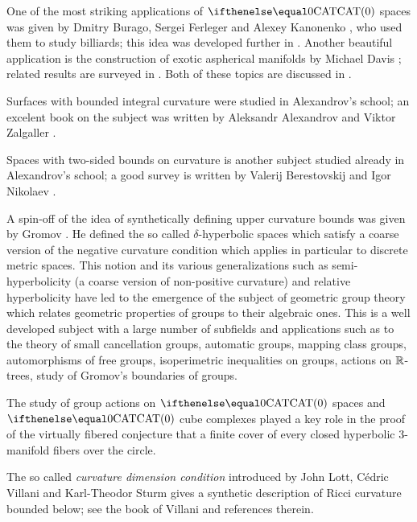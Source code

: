 One of the most striking applications of $\CAT0$ spaces was given by Dmitry Burago, Sergei Ferleger and Alexey Kanonenko \cite{burago-ferleger-kononenko1998-1},
who used them to study billiards; this idea was developed further in \cite{burago-ferleger-kononenko1998-2,burago-ferleger-kononenko1998-3,burago-ferleger-kononenko1998-4,burago-ferleger-kononenko2000,burago-ferleger-kononenko2001}. 
Another beautiful application is the construction of exotic aspherical manifolds by Michael Davis \cite{davis:aspherical}; related results are surveyed in \cite{davis:exotic,charney-davis}.
Both of these topics are discussed in \cite{alexander-kapovitch-petrunin-CAT}.

Surfaces with bounded integral curvature were studied in Alexandrov's school;
an excelent book on the subject was written by Aleksandr Alexandrov and Viktor Zalgaller \cite{aleksandrov-zalgaller}.

Spaces with two-sided bounds on curvature is another subject studied already in Alexandrov's school;
a good survey is written by Valerij Berestovskij and Igor Nikolaev \cite{berestovskii-nikolaev}.

A spin-off of the idea of synthetically defining upper curvature bounds 
was given by Gromov \cite{gromov:hyp-groups}. 
He  defined the so called  $\delta$-hyperbolic spaces which satisfy   a coarse version of the  negative curvature condition which applies in particular to discrete metric spaces.
This notion and its various generalizations such as semi-hyperbolicity (a coarse version of non-positive curvature) and relative hyperbolicity have  led to the emergence of the subject of geometric group theory which relates geometric properties of groups to their algebraic ones.
This is a well developed subject with a large number of subfields and applications such as to the theory of small cancellation groups, automatic groups,  mapping class groups, automorphisms of free groups, isoperimetric inequalities on groups, actions on $\mathbb{R}$-trees, study of Gromov's boundaries of groups.

The study of group actions on $\CAT 0$ spaces and $\CAT 0$ cube complexes played a key role in the proof of the virtually fibered conjecture that a finite cover of  every closed hyperbolic 3-manifold fibers over the circle.

The so called \emph{curvature dimension condition} introduced by John Lott, C\'edric Villani and Karl-Theodor Sturm gives a synthetic description of Ricci curvature bounded below; see the book of Villani \cite{villani} and references therein.

